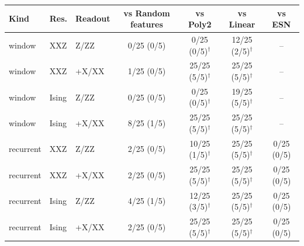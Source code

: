 \begin{tabular}{lllcccc}
\toprule
Kind & Res. & Readout & vs Random features & vs Poly2 & vs Linear & vs ESN \\
\midrule
window & XXZ & Z/ZZ & 0/25 (0/5) & 0/25 (0/5)$^\dagger$ & 12/25 (2/5)$^\dagger$ & -- \\
window & XXZ & +X/XX & 1/25 (0/5) & 25/25 (5/5)$^\dagger$ & 25/25 (5/5)$^\dagger$ & -- \\
window & Ising & Z/ZZ & 0/25 (0/5) & 0/25 (0/5)$^\dagger$ & 19/25 (5/5)$^\dagger$ & -- \\
window & Ising & +X/XX & 8/25 (1/5) & 25/25 (5/5)$^\dagger$ & 25/25 (5/5)$^\dagger$ & -- \\
\midrule
recurrent & XXZ & Z/ZZ & 2/25 (0/5) & 10/25 (1/5)$^\dagger$ & 25/25 (5/5)$^\dagger$ & 0/25 (0/5) \\
recurrent & XXZ & +X/XX & 2/25 (0/5) & 25/25 (5/5)$^\dagger$ & 25/25 (5/5)$^\dagger$ & 0/25 (0/5) \\
recurrent & Ising & Z/ZZ & 4/25 (1/5) & 12/25 (3/5)$^\dagger$ & 25/25 (5/5)$^\dagger$ & 0/25 (0/5) \\
recurrent & Ising & +X/XX & 2/25 (0/5) & 25/25 (5/5)$^\dagger$ & 25/25 (5/5)$^\dagger$ & 0/25 (0/5) \\
\bottomrule
\end{tabular}
